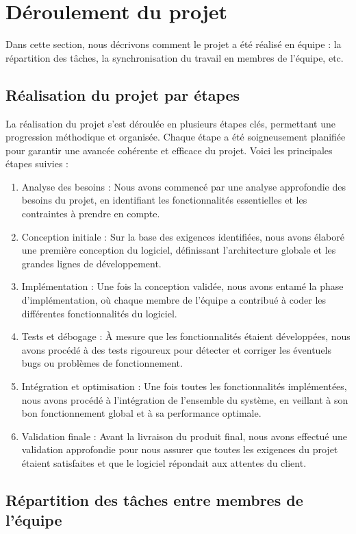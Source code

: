 \newpage
\section{Déroulement du projet}
\label{sec:deroulement}

Dans cette section, nous décrivons comment le projet a été réalisé en équipe : la répartition des tâches, la synchronisation du travail en membres de l'équipe, etc.

\subsection{Réalisation du projet par étapes}
La réalisation du projet s'est déroulée en plusieurs étapes clés, permettant une progression méthodique et organisée. Chaque étape a été soigneusement planifiée pour garantir une avancée cohérente et efficace du projet. Voici les principales étapes suivies :
\begin{enumerate}
\item  Analyse des besoins : Nous avons commencé par une analyse approfondie des besoins du projet, en identifiant les fonctionnalités essentielles et les contraintes à prendre en compte.
\item  Conception initiale : Sur la base des exigences identifiées, nous avons élaboré une première conception du logiciel, définissant l'architecture globale et les grandes lignes de développement.
\item  Implémentation : Une fois la conception validée, nous avons entamé la phase d'implémentation, où chaque membre de l'équipe a contribué à coder les différentes fonctionnalités du logiciel.
\item  Tests et débogage : À mesure que les fonctionnalités étaient développées, nous avons procédé à des tests rigoureux pour détecter et corriger les éventuels bugs ou problèmes de fonctionnement.
\item  Intégration et optimisation : Une fois toutes les fonctionnalités implémentées, nous avons procédé à l'intégration de l'ensemble du système, en veillant à son bon fonctionnement global et à sa performance optimale.
\item  Validation finale : Avant la livraison du produit final, nous avons effectué une validation approfondie pour nous assurer que toutes les exigences du projet étaient satisfaites et que le logiciel répondait aux attentes du client.

\end{enumerate}
\newpage
\subsection{Répartition des tâches entre membres de l'équipe}
